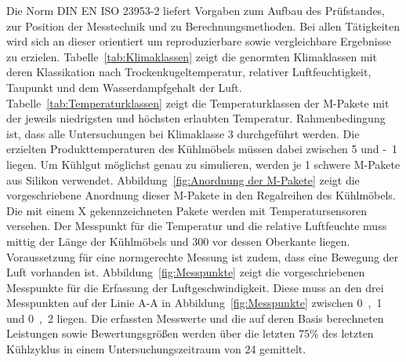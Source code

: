 Die Norm DIN EN ISO 23953-2 liefert Vorgaben zum Aufbau des Prüfstandes, zur Position der Messtechnik und zu Berechnungsmethoden. Bei allen Tätigkeiten wird sich an dieser orientiert um reproduzierbare sowie vergleichbare Ergebnisse zu erzielen.
Tabelle~\ref{tab:Klimaklassen} zeigt die genormten Klimaklassen mit deren Klassikation nach Trockenkugeltemperatur, relativer Luftfeuchtigkeit, Taupunkt und dem Wasserdampfgehalt der Luft. Tabelle~\ref{tab:Temperaturklassen} zeigt die Temperaturklassen der M-Pakete mit der jeweils niedrigsten und höchsten erlaubten Temperatur. Rahmenbedingung ist, dass alle Untersuchungen bei Klimaklasse 3 durchgeführt werden. Die erzielten Produkttemperaturen des Kühlmöbels müssen dabei zwischen \unit{5}{\celsius} und \unit{-1}{\celsius} liegen. \newline
Um Kühlgut möglichst genau zu simulieren, werden je \unit{1}{\kilogram} schwere M-Pakete aus Silikon verwendet. Abbildung~\ref{fig:Anordnung der M-Pakete} zeigt die vorgeschriebene Anordnung dieser M-Pakete in den Regalreihen des Kühlmöbels. Die mit einem X gekennzeichneten Pakete werden mit Temperatursensoren versehen.
Der Messpunkt für die Temperatur und die relative Luftfeuchte muss mittig der Länge der Kühlmöbels und \unit{300}{\milli\metre} vor dessen Oberkante liegen. \newline
Voraussetzung für eine normgerechte Messung ist zudem, dass eine Bewegung der Luft vorhanden ist. Abbildung~\ref{fig:Messpunkte} zeigt die vorgeschriebenen Messpunkte für die Erfassung der Luftgeschwindigkeit. Diese muss an den drei Messpunkten auf der Linie A-A in Abbildung~\ref{fig:Messpunkte} zwischen \unit{0,1}{\meter\per\second} und \unit{0,2}{\meter\per\second} liegen\cite{DINDeutschesInstitutfurNormunge.V..}. \newline
Die erfassten Messwerte und die auf deren Basis berechneten Leistungen sowie Bewertungsgrößen werden über die letzten \unit{75}{\%} des letzten Kühlzyklus in einem Untersuchungszeitraum von \unit{24}{\hour} gemittelt.





